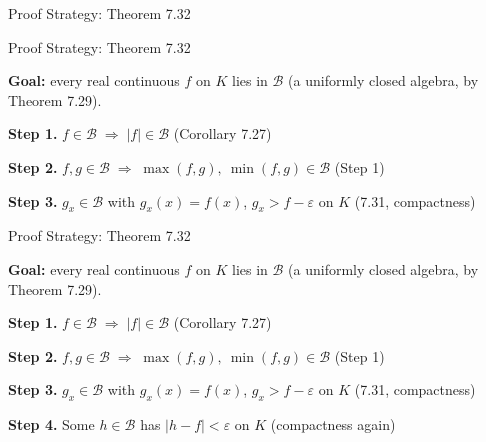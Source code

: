 \documentclass[aspectratio=169,12pt,t]{beamer}
\begin{document}
{\begin{frame}{Proof Strategy: Theorem 7.32}
\end{frame}

\begin{frame}{Proof Strategy: Theorem 7.32}
  \begin{hlbox}
  \textbf{Goal:} every real continuous $f$ on $K$ lies in $\mathscr{B}$
  {\small (a uniformly closed algebra, by Theorem 7.29).}

  \vspace{0.8em}
  \textbf{Step 1.}\;\; $f \in \mathscr{B} \;\Longrightarrow\; |f| \in \mathscr{B}$
  \hfill {\small (Corollary 7.27)}\par\vspace{0.7em}
  \textbf{Step 2.}\;\; $f, g \in \mathscr{B} \;\Longrightarrow\; \max(f,g),\ \min(f,g) \in \mathscr{B}$
  \hfill {\small (Step 1)}\par\vspace{0.7em}
  \textbf{Step 3.}\;\; $g_x \in \mathscr{B}$ with $g_x(x) = f(x)$, \;$g_x > f - \varepsilon$ on $K$
  \hfill {\small (7.31, compactness)}\par\vspace{0.7em}
  \end{hlbox}

\end{frame}

\begin{frame}{Proof Strategy: Theorem 7.32}
  \begin{hlbox}
  \textbf{Goal:} every real continuous $f$ on $K$ lies in $\mathscr{B}$
  {\small (a uniformly closed algebra, by Theorem 7.29).}

  \vspace{0.8em}
  \textbf{Step 1.}\;\; $f \in \mathscr{B} \;\Longrightarrow\; |f| \in \mathscr{B}$
  \hfill {\small (Corollary 7.27)}\par\vspace{0.7em}
  \textbf{Step 2.}\;\; $f, g \in \mathscr{B} \;\Longrightarrow\; \max(f,g),\ \min(f,g) \in \mathscr{B}$
  \hfill {\small (Step 1)}\par\vspace{0.7em}
  \textbf{Step 3.}\;\; $g_x \in \mathscr{B}$ with $g_x(x) = f(x)$, \;$g_x > f - \varepsilon$ on $K$
  \hfill {\small (7.31, compactness)}\par\vspace{0.7em}
  \textbf{Step 4.}\;\; Some $h \in \mathscr{B}$ has $|h - f| < \varepsilon$ on $K$
  \hfill {\small (compactness again)}
  \end{hlbox}


\end{frame}}
\end{document}
